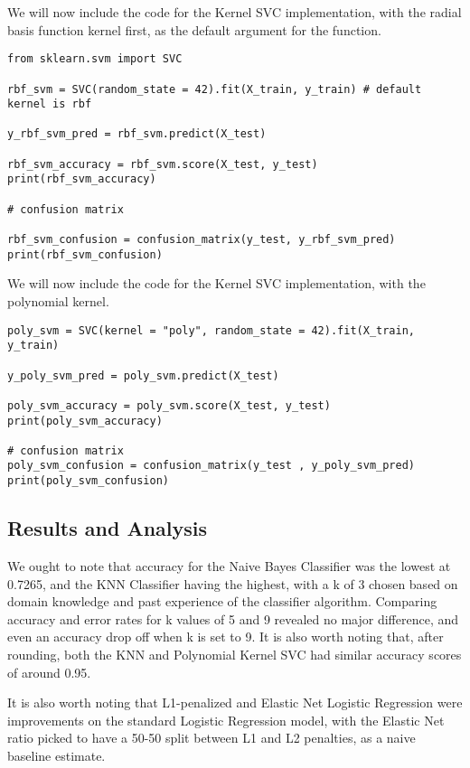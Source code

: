 \documentclass[12pt, letterpaper]{article}
\begin{document}
We will now include the code for the Kernel SVC implementation, with the radial basis function kernel first, as the default argument for the function. 

\begin{verbatim} 
from sklearn.svm import SVC 

rbf_svm = SVC(random_state = 42).fit(X_train, y_train) # default kernel is rbf  

y_rbf_svm_pred = rbf_svm.predict(X_test) 

rbf_svm_accuracy = rbf_svm.score(X_test, y_test) 
print(rbf_svm_accuracy) 

# confusion matrix 

rbf_svm_confusion = confusion_matrix(y_test, y_rbf_svm_pred) 
print(rbf_svm_confusion) 
\end{verbatim} 

We will now include the code for the Kernel SVC implementation, with the polynomial kernel. 

\begin{verbatim} 
poly_svm = SVC(kernel = "poly", random_state = 42).fit(X_train, y_train) 

y_poly_svm_pred = poly_svm.predict(X_test) 

poly_svm_accuracy = poly_svm.score(X_test, y_test) 
print(poly_svm_accuracy) 

# confusion matrix 
poly_svm_confusion = confusion_matrix(y_test , y_poly_svm_pred)
print(poly_svm_confusion) 
\end{verbatim} 

\subsection{Results and Analysis} 

We ought to note that accuracy for the Naive Bayes Classifier was the lowest at 0.7265, and the KNN Classifier having the highest, with a k of 3 chosen based on domain knowledge and past experience of the classifier algorithm. Comparing accuracy and error rates for k values of 5 and 9 revealed no major difference, and even an accuracy drop off when k is set to 9. It is also worth noting that, after rounding, both the KNN and Polynomial Kernel SVC had similar accuracy scores of around 0.95. 

It is also worth noting that L1-penalized and Elastic Net Logistic Regression were improvements on the standard Logistic Regression model, with the Elastic Net ratio picked to have a 50-50 split between L1 and L2 penalties, as a naive baseline estimate. 
\end{document}
